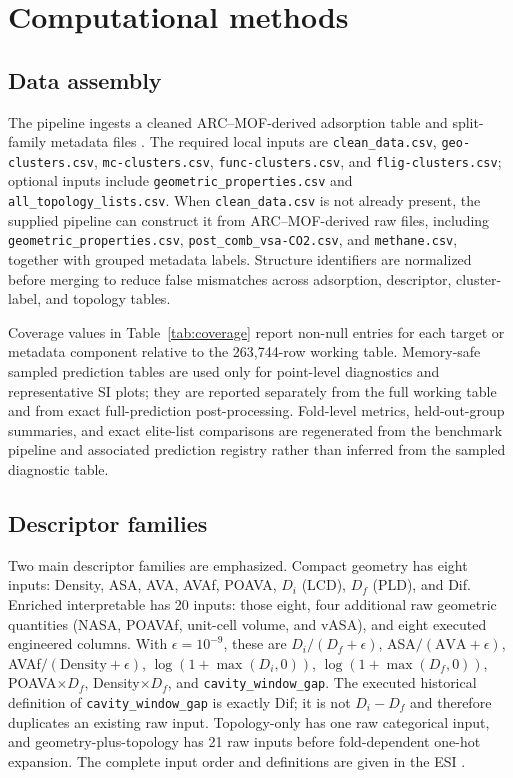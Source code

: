 \documentclass[11pt,a4paper]{article}
\begin{document}
\section*{Computational methods}
\subsection*{Data assembly}
The pipeline ingests a cleaned ARC--MOF-derived adsorption table and split-family metadata files \citep{Burner2023ARCMOF}. The required local inputs are \texttt{clean\_data.csv}, \texttt{geo-clusters.csv}, \texttt{mc-clusters.csv}, \texttt{func-clusters.csv}, and \texttt{flig-clusters.csv}; optional inputs include \texttt{geometric\_properties.csv} and \texttt{all\_topology\_lists.csv}. When \texttt{clean\_data.csv} is not already present, the supplied pipeline can construct it from ARC--MOF-derived raw files, including \texttt{geometric\_properties.csv}, \texttt{post\_comb\_vsa-CO2.csv}, and \texttt{methane.csv}, together with grouped metadata labels. Structure identifiers are normalized before merging to reduce false mismatches across adsorption, descriptor, cluster-label, and topology tables.


Coverage values in Table~\ref{tab:coverage} report non-null entries for each target or metadata component relative to the 263,744-row working table. Memory-safe sampled prediction tables are used only for point-level diagnostics and representative SI plots; they are reported separately from the full working table and from exact full-prediction post-processing. Fold-level metrics, held-out-group summaries, and exact elite-list comparisons are regenerated from the benchmark pipeline and associated prediction registry rather than inferred from the sampled diagnostic table.


\subsection*{Descriptor families}
Two main descriptor families are emphasized. Compact geometry has eight inputs: Density, ASA, AVA, AVAf, POAVA, $D_i$ (LCD), $D_f$ (PLD), and Dif. Enriched interpretable has 20 inputs: those eight, four additional raw geometric quantities (NASA, POAVAf, unit-cell volume, and vASA), and eight executed engineered columns. With $\epsilon=10^{-9}$, these are $D_i/(D_f+\epsilon)$, ASA$/(\mathrm{AVA}+\epsilon)$, AVAf$/(\mathrm{Density}+\epsilon)$, $\log(1+\max(D_i,0))$, $\log(1+\max(D_f,0))$, POAVA$\times D_f$, Density$\times D_f$, and \texttt{cavity\_window\_gap}. The executed historical definition of \texttt{cavity\_window\_gap} is exactly Dif; it is not $D_i-D_f$ and therefore duplicates an existing raw input. Topology-only has one raw categorical input, and geometry-plus-topology has 21 raw inputs before fold-dependent one-hot expansion. The complete input order and definitions are given in the ESI \citep{Fernandez2014MLCO2MOFs,Bucior2019EnergyDescriptors}.
\end{document}
